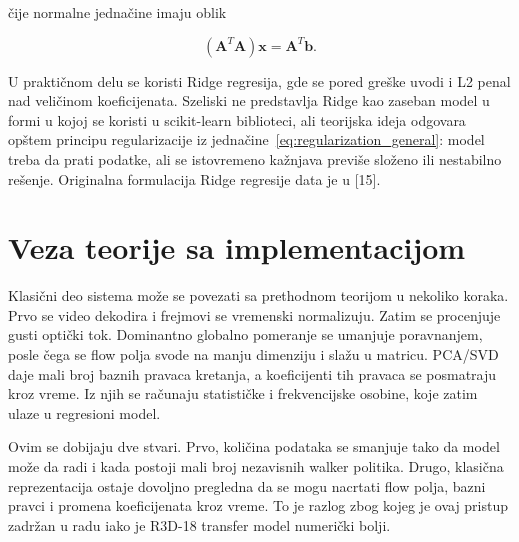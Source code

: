čije normalne jednačine imaju oblik

\begin{equation}
(\mathbf{A}^T\mathbf{A})\mathbf{x}=\mathbf{A}^T\mathbf{b}.
\label{eq:normal_equations}
\end{equation}

U praktičnom delu se koristi Ridge regresija, gde se pored greške uvodi i L2 penal nad veličinom koeficijenata. Szeliski ne predstavlja Ridge kao zaseban model u formi u kojoj se koristi u scikit-learn biblioteci, ali teorijska ideja odgovara opštem principu regularizacije iz jednačine~\ref{eq:regularization_general}: model treba da prati podatke, ali se istovremeno kažnjava previše složeno ili nestabilno rešenje. Originalna formulacija Ridge regresije data je u [15].

\section{Veza teorije sa implementacijom}

Klasični deo sistema može se povezati sa prethodnom teorijom u nekoliko koraka. Prvo se video dekodira i frejmovi se vremenski normalizuju. Zatim se procenjuje gusti optički tok. Dominantno globalno pomeranje se umanjuje poravnanjem, posle čega se flow polja svode na manju dimenziju i slažu u matricu. PCA/SVD daje mali broj baznih pravaca kretanja, a koeficijenti tih pravaca se posmatraju kroz vreme. Iz njih se računaju statističke i frekvencijske osobine, koje zatim ulaze u regresioni model.

Ovim se dobijaju dve stvari. Prvo, količina podataka se smanjuje tako da model može da radi i kada postoji mali broj nezavisnih walker politika. Drugo, klasična reprezentacija ostaje dovoljno pregledna da se mogu nacrtati flow polja, bazni pravci i promena koeficijenata kroz vreme. To je razlog zbog kojeg je ovaj pristup zadržan u radu iako je R3D-18 transfer model numerički bolji.

